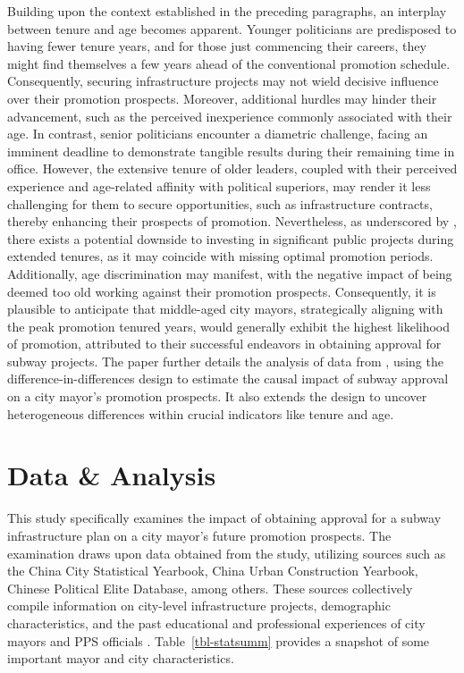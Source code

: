 \documentclass[12pt, ]{article}
\begin{document}
Building upon the context established in the preceding paragraphs, an
interplay between tenure and age becomes apparent. Younger politicians
are predisposed to having fewer tenure years, and for those just
commencing their careers, they might find themselves a few years ahead
of the conventional promotion schedule. Consequently, securing
infrastructure projects may not wield decisive influence over their
promotion prospects. Moreover, additional hurdles may hinder their
advancement, such as the perceived inexperience commonly associated with
their age. In contrast, senior politicians encounter a diametric
challenge, facing an imminent deadline to demonstrate tangible results
during their remaining time in office. However, the extensive tenure of
older leaders, coupled with their perceived experience and age-related
affinity with political superiors, may render it less challenging for
them to secure opportunities, such as infrastructure contracts, thereby
enhancing their prospects of promotion. Nevertheless, as underscored by
\citet{guo2009china}, there exists a potential downside to investing in
significant public projects during extended tenures, as it may coincide
with missing optimal promotion periods. Additionally, age discrimination
may manifest, with the negative impact of being deemed too old working
against their promotion prospects. Consequently, it is plausible to
anticipate that middle-aged city mayors, strategically aligning with the
peak promotion tenured years, would generally exhibit the highest
likelihood of promotion, attributed to their successful endeavors in
obtaining approval for subway projects. The paper further details the
analysis of data from \citet{lei2022private}, using the
difference-in-differences design to estimate the causal impact of subway
approval on a city mayor's promotion prospects. It also extends the
design to uncover heterogeneous differences within crucial indicators
like tenure and age.

\hypertarget{data-analysis}{%
\section{Data \& Analysis}\label{data-analysis}}

This study specifically examines the impact of obtaining approval for a
subway infrastructure plan on a city mayor's future promotion prospects.
The examination draws upon data obtained from the \citet{lei2022private}
study, utilizing sources such as the China City Statistical Yearbook,
China Urban Construction Yearbook, Chinese Political Elite Database,
among others. These sources collectively compile information on
city-level infrastructure projects, demographic characteristics, and the
past educational and professional experiences of city mayors and PPS
officials \citep{lei2022private}. Table~\ref{tbl-statsumm} provides a
snapshot of some important mayor and city characteristics.
\end{document}
